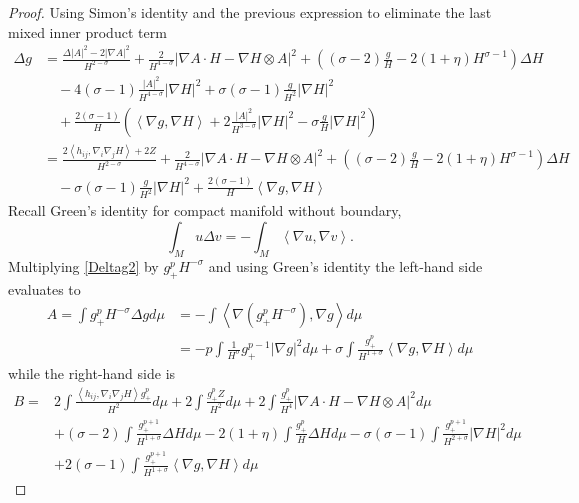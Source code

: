 \begin{proof}
    Using Simon's identity and the previous expression to  eliminate the last mixed inner product term 
    \begin{align}
        \Delta g & = \frac{\Delta |A|^{2}- 2|\nabla A|^{2}}{H^{2-\sigma}} + \frac{2}{H^{4-\sigma}}| \nabla A \cdot H - \nabla H \otimes A|^{2} + \left( (\sigma-2)\frac{g}{H} - 2(1+\eta)H^{\sigma-1} \right)\Delta H \nonumber \\
        & \quad - 4(\sigma -1) \frac{|A|^{2}}{H^{4-\sigma}} |\nabla H|^{2} + \sigma(\sigma -1)\frac{g}{H^{2}}|\nabla H|^{2} \nonumber \\
        & \quad + \frac{2(\sigma -1)}{H}\left( \left< \nabla g, \nabla H \right> +2 \frac{|A|^{2}}{H^{3-\sigma}}|\nabla H|^{2} - \sigma \frac{g}{H}|\nabla H|^{2} \right) \nonumber \\
        & = \frac{2\left< h_{ij}, \nabla_{i}\nabla_{j}H \right>+2Z}{H^{2-\sigma}} + \frac{2}{H^{4-\sigma}}| \nabla A \cdot H - \nabla H \otimes A|^{2} + \left( (\sigma-2)\frac{g}{H} - 2(1+\eta)H^{\sigma-1} \right)\Delta H \nonumber \\
        & \quad - \sigma(\sigma-1) \frac{g}{H^{2}}|\nabla H|^{2} + \frac{2(\sigma -1)}{H}\left< \nabla g, \nabla H \label{Deltag2}\right>
    \end{align}
    Recall Green's identity for compact manifold without boundary, 
    \[ \int_{M} u \Delta v = -\int_{M} \left< \nabla u, \nabla v \right> .\]
    Multiplying \cref{Deltag2} by $ g_{+}^{p}H^{-\sigma} $ and using Green's identity the left-hand side evaluates to \begin{align}
      A =  \int g_{+}^{p}H^{-\sigma}\Delta g  d \mu & =- \int \left< \nabla(g_{+}^{p}H^{-\sigma}), \nabla g \right> d \mu \nonumber\\
       & =  -p \int \frac{1}{H^{\sigma}}g_{+}^{p-1}|\nabla g|^{2}d \mu+ \sigma \int \frac{g_{+}^{p}}{H^{1+\sigma}}\left< \nabla g,  \nabla H \right>d \mu \label{ddd}
    \end{align}
    while the right-hand side is \begin{align}
       B =  & 2 \int \frac{\left< h_{ij}, \nabla_{i}\nabla_{j}H \right>g_{+}^{p}}{H^{2}}d \mu + 2 \int \frac{g_{+}^{p}Z}{H^{2}}d \mu + 2 \int \frac{g_{+}^{p}}{H^{4}}| \nabla A \cdot H - \nabla H \otimes A|^{2}d \mu \nonumber \\
        & + (\sigma-2)\int \frac{g_{+}^{p+1}}{H^{1+\sigma}}\Delta H d \mu -2(1+ \eta) \int \frac{g_{+}^{p}}{H}\Delta H d \mu  - \sigma(\sigma -1) \int \frac{g_{+}^{p+1}}{H^{2+\sigma}}|\nabla H|^{2}d \mu \nonumber\\
        & + 2(\sigma -1) \int \frac{g_{+}^{p+1}}{H^{1+\sigma}}\left< \nabla g, \nabla H \right>d \mu \label{eee}
    \end{align}


\end{proof}

